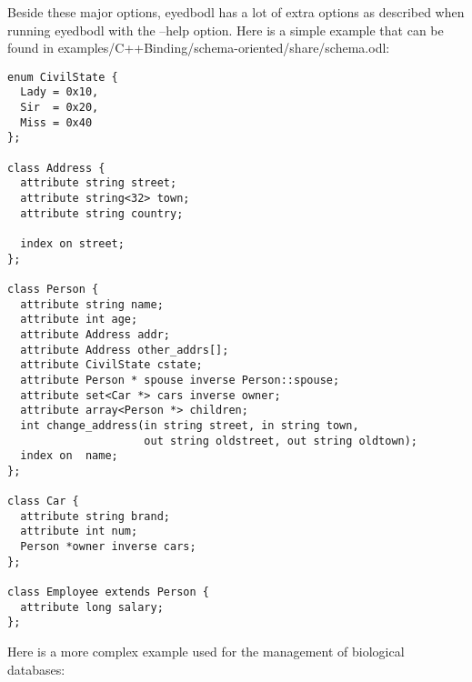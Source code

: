 Beside these major options, eyedbodl has a lot of extra options as
described when running eyedbodl with the --help option.
\newpage
{}
Here is a simple example that can be found
in examples/C++Binding/schema-oriented/share/schema.odl:
\begin{verbatim}
enum CivilState {
  Lady = 0x10,
  Sir  = 0x20,
  Miss = 0x40
};

class Address {
  attribute string street;
  attribute string<32> town;
  attribute string country;

  index on street;
};

class Person {
  attribute string name;
  attribute int age;
  attribute Address addr;
  attribute Address other_addrs[];
  attribute CivilState cstate;
  attribute Person * spouse inverse Person::spouse;
  attribute set<Car *> cars inverse owner;
  attribute array<Person *> children;
  int change_address(in string street, in string town,
                     out string oldstreet, out string oldtown);
  index on  name;
};

class Car {
  attribute string brand;
  attribute int num;
  Person *owner inverse cars;
};

class Employee extends Person {
  attribute long salary;
};
\end{verbatim}
\newpage
{}
Here is a more complex example used for the management of biological
databases:
